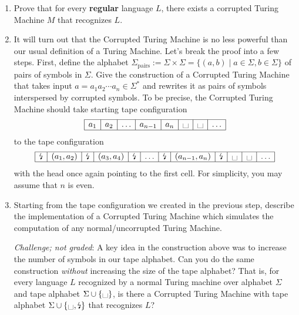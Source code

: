 \begin{enumerate}
\begin{enumerate}
\item\gradeCorrect Prove that for every {\bf regular} language $L$, there exists a corrupted 
Turing Machine $M$ that recognizes $L$.

\item\gradeComplete It will turn out that the Corrupted Turing Machine is no less powerful than our 
usual definition of a Turing Machine. Let's break the proof into a few steps. First, define the 
alphabet $\Sigma_{\mathrm{pairs}}:= \Sigma \times \Sigma = \{ (a,b) \mid a \in \Sigma, b \in \Sigma\}$ 
of pairs of symbols in $\Sigma$. Give the construction of a Corrupted Turing Machine that takes 
input $a = a_1 a_2 \cdots a_n \in \Sigma^*$ and rewrites it as pairs of symbols interspersed 
by corrupted symbols. To be precise, the Corrupted Turing Machine should take starting tape configuration
\[
\begin{array}{| c | c | c | c | c | c | c | c | }  \hline
a_1 & a_2 & \ldots & a_{n-1} & a_{n} & \blank & \blank & \ldots \\ \hline
\end{array}
\]
to the tape configuration 
\[
\begin{array}{| c | c | c | c | c | c | c | c | c | c | c | c| }  \hline
\corrupted & (a_1, a_2) & \corrupted & (a_3,a_4) & \corrupted & \ldots& \corrupted 
& (a_{n-1}, a_{n}) & \corrupted & \blank & \blank & \ldots \\ \hline
\end{array}
\]
with the head once again pointing to the first cell. For simplicity, you may assume that $n$ is even.

\item\gradeComplete Starting from the tape configuration we created in the previous step, 
describe the implementation of a Corrupted Turing Machine which simulates the computation of 
any normal/uncorrupted Turing Machine.

\vspace{1em}
\noindent\textit{Challenge; not graded}: A key idea in the construction above was 
to increase the number of symbols in our tape alphabet. Can you do the same construction 
\emph{without} increasing the size of the tape alphabet? That is, for every language $L$ 
recognized by a normal Turing machine over alphabet $\Sigma$ and tape alphabet $\Sigma \cup \{\blank\}$, 
is there a Corrupted Turing Machine with tape alphabet $\Sigma \cup \{\blank,\corrupted\}$ that recognizes $L$?

\end{enumerate}


\end{enumerate}
